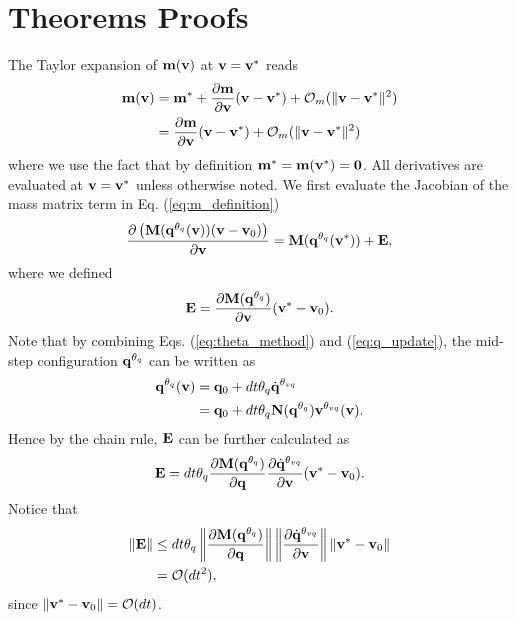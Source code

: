 \section{Theorems Proofs}

\begin{IEEEproof}
The Taylor expansion of ${\mathbf{m}}({\mathbf{v}})$ at ${\mathbf{v}}={\mathbf{v}}^*$ reads
\begin{align}
	\mf{m}(\mf{v}) &= \mf{m}^* + \frac{\partial \mf{m}}{\partial \mf{v}} (\mf{v}-\mf{v}^*) +
	\mathcal{O}_m(\Vert\mf{v}-\mf{v}^*\Vert^2)\nonumber\\
	&=\frac{\partial \mf{m}}{\partial \mf{v}}(\mf{v}-\mf{v}^*) +
	\mathcal{O}_m(\Vert\mf{v}-\mf{v}^*\Vert^2)
	\label{eq:m_taylor_expansion}
\end{align}
where we use the fact that by definition ${\mathbf{m}}^*={\mathbf{m}}({\mathbf{v}}^*)={\mathbf{0}}$. All
derivatives are evaluated at ${\mathbf{v}} = {\mathbf{v}}^*$ unless otherwise noted. We
first evaluate the Jacobian of the mass matrix term in Eq.
(\ref{eq:m_definition})
\begin{align*}
	\frac{\partial \left( {\mathbf{M}}({\mathbf{q}}^{\theta_{q}}({\mathbf{v}}))({\mathbf{v}}-{\mathbf{v}}_0) \right)}{\partial {\mathbf{v}}}
	= {\mathbf{M}}({\mathbf{q}}^{\theta_{q}}({\mathbf{v}}^*)) + {\mathbf{E}},
\end{align*}
where we defined
\begin{align*}
	{\mathbf{E}} = \frac{\partial {\mathbf{M}}({\mathbf{q}}^{\theta_{q}})}{\partial{\mathbf{v}}} ({\mathbf{v}}^*-{\mathbf{v}}_0).
\end{align*}
Note that by combining Eqs. (\ref{eq:theta_method}) and (\ref{eq:q_update}), the
mid-step configuration ${\mathbf{q}}^{\theta_q}$ can be written as
\begin{align*}
	{\mathbf{q}}^{\theta_q}({\mathbf{v}}) &= {\mathbf{q}}_0 + dt \theta_q \dot{{\mathbf{q}}}^{\theta_{vq}} \\
	                          &= {\mathbf{q}}_0 + dt \theta_q {\mathbf{N}}({\mathbf{q}}^{\theta_{q}}){\mathbf{v}}^{\theta_{vq}}({\mathbf{v}}).
\end{align*}
Hence by the chain rule, ${\mathbf{E}}$ can be further calculated as
\begin{align*}
	{\mathbf{E}} = dt\theta_q\frac{\partial {\mathbf{M}}({\mathbf{q}}^{\theta_{q}}) }{\partial{\mathbf{q}}}
             \frac{\partial\dot{{\mathbf{q}}}^{\theta_{vq}}}{\partial{\mathbf{v}}}
			 ({\mathbf{v}}^*-{\mathbf{v}}_0).
\end{align*}
Notice that 
\begin{align*}
		\Vert{\mathbf{E}}\Vert 
		&\le dt\theta_q \left\| \frac{\partial{\mathbf{M}}({\mathbf{q}}^{\theta_{q}})}{\partial{\mathbf{q}}}  \right\|
			\left\| \frac{\partial\dot{{\mathbf{q}}}^{\theta_{vq}}}{\partial{\mathbf{v}}}  \right\|
		    \left\| {\mathbf{v}}^*-{\mathbf{v}}_0 \right\| \\
		&= \mathcal{O}(dt^2),
\end{align*}
since $\Vert{\mathbf{v}}^*-{\mathbf{v}}_0\Vert = \mathcal{O}(dt)$.


\end{IEEEproof}
